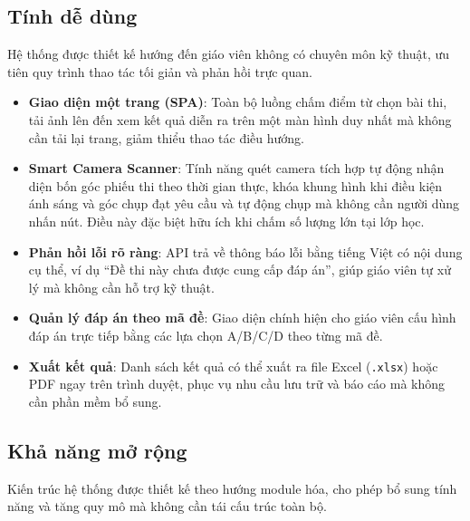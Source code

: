 \subsection{Tính dễ dùng}
Hệ thống được thiết kế hướng đến giáo viên không có chuyên môn kỹ thuật, ưu tiên quy trình thao tác tối giản và phản hồi trực quan.

\begin{itemize}[leftmargin=1.5cm]
  \item \textbf{Giao diện một trang (SPA)}: Toàn bộ luồng chấm điểm từ chọn bài thi, tải ảnh lên đến xem kết quả diễn ra trên một màn hình duy nhất mà không cần tải lại trang, giảm thiểu thao tác điều hướng.
  \item \textbf{Smart Camera Scanner}: Tính năng quét camera tích hợp tự động nhận diện bốn góc phiếu thi theo thời gian thực, khóa khung hình khi điều kiện ánh sáng và góc chụp đạt yêu cầu và tự động chụp mà không cần người dùng nhấn nút. Điều này đặc biệt hữu ích khi chấm số lượng lớn tại lớp học.
  \item \textbf{Phản hồi lỗi rõ ràng}: API trả về thông báo lỗi bằng tiếng Việt có nội dung cụ thể, ví dụ ``Đề thi này chưa được cung cấp đáp án'', giúp giáo viên tự xử lý mà không cần hỗ trợ kỹ thuật.
  \item \textbf{Quản lý đáp án theo mã đề}: Giao diện chính hiện cho giáo viên cấu hình đáp án trực tiếp bằng các lựa chọn A/B/C/D theo từng mã đề.
  \item \textbf{Xuất kết quả}: Danh sách kết quả có thể xuất ra file Excel (\texttt{.xlsx}) hoặc PDF ngay trên trình duyệt, phục vụ nhu cầu lưu trữ và báo cáo mà không cần phần mềm bổ sung.
\end{itemize}

\subsection{Khả năng mở rộng}
Kiến trúc hệ thống được thiết kế theo hướng module hóa, cho phép bổ sung tính năng và tăng quy mô mà không cần tái cấu trúc toàn bộ.

